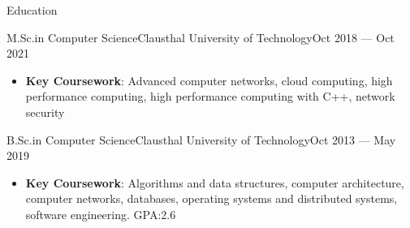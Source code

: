 \documentclass[]{mcdowellcv}
\begin{document}
\makeheader%

\begin{cvsection}{Education}
\begin{cvsubsection}{M.Sc.\@ in Computer Science}{Clausthal University of Technology}{Oct 2018 --- Oct 2021}
\bigskip
\begin{itemize}
\item \textbf{Key Coursework}: Advanced computer networks, cloud computing, high performance computing, high performance computing with C++, network security
\end{itemize}
\end{cvsubsection}
\begin{cvsubsection}{B.Sc.\@ in Computer Science}{Clausthal University of Technology}{Oct 2013 --- May 2019}
\bigskip
\begin{itemize}
\item \textbf{Key Coursework}: Algorithms and data structures, computer architecture, computer networks, databases, operating systems and distributed systems, software engineering. GPA:\@ 2.6
\end{itemize}
\end{cvsubsection}


\end{cvsection}
\end{document}
